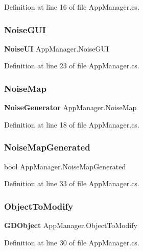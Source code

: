 Definition at line 16 of file App\+Manager.\+cs.

\mbox{\label{class_app_manager_ae0ede192a7796f0ed7e4a1bbeb2a796f}} 
\subsubsection{Noise\+G\+UI}
{\footnotesize\ttfamily \textbf{ Noise\+UI} App\+Manager.\+Noise\+G\+UI}



Definition at line 23 of file App\+Manager.\+cs.

\mbox{\label{class_app_manager_a1c819b0ece0baa2b589ad40f1a312051}} 
\subsubsection{Noise\+Map}
{\footnotesize\ttfamily \textbf{ Noise\+Generator} App\+Manager.\+Noise\+Map}



Definition at line 18 of file App\+Manager.\+cs.

\mbox{\label{class_app_manager_ab8b6cbf98282a43305605f993743c422}} 
\subsubsection{Noise\+Map\+Generated}
{\footnotesize\ttfamily bool App\+Manager.\+Noise\+Map\+Generated}



Definition at line 33 of file App\+Manager.\+cs.

\mbox{\label{class_app_manager_a0f0cfcbeebd91fcc75dba8f0add810f1}} 
\subsubsection{Object\+To\+Modify}
{\footnotesize\ttfamily \textbf{ G\+D\+Object} App\+Manager.\+Object\+To\+Modify}



Definition at line 30 of file App\+Manager.\+cs.

